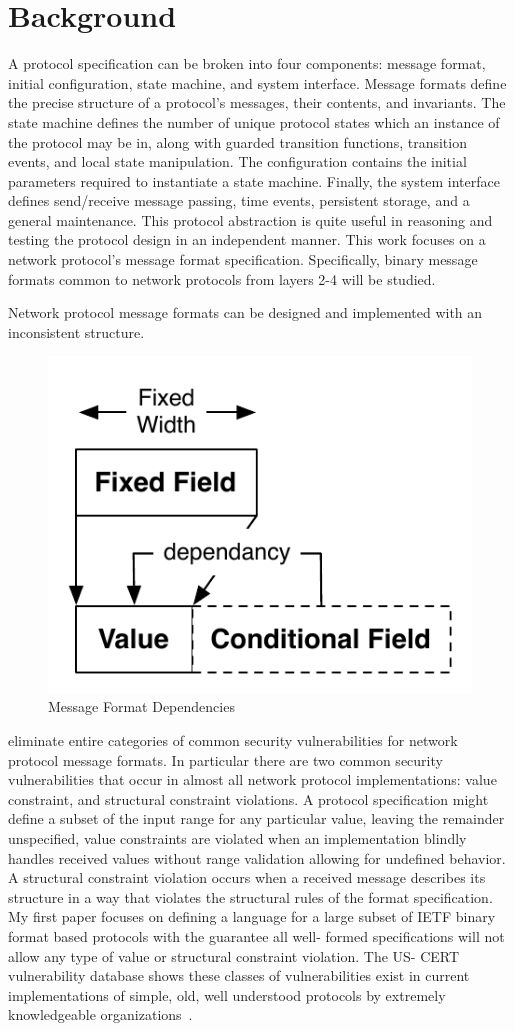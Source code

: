 \section{Background}
     
A protocol specification can be broken into four components: message format,
initial configuration, state machine, and system interface. Message formats
define the precise structure of a protocol's messages, their contents, and
invariants. The state machine defines the number of unique protocol states 
which an instance of the protocol may be in, along with guarded transition
functions, transition events, and local state manipulation. The configuration
contains the initial parameters required to instantiate a state machine.
Finally, the system interface defines send/receive message passing, time events,
persistent storage, and a general maintenance. This protocol abstraction is
quite useful in reasoning and testing the protocol design in an independent
manner. This work focuses on a network protocol's message format specification.
Specifically, binary message formats common to network protocols from layers 2-4
will be studied.

Network protocol message formats can be designed and implemented with an
inconsistent structure. 

\begin{figure}[h]
   \begin{center}
   \includegraphics[width=.40\textwidth]{figs/fig1.pdf}
   \caption{Message Format Dependencies}
   \label{figure:fig1}
   \end{center}
\end{figure}

eliminate entire categories of common security
vulnerabilities for network protocol message formats. In particular there are
two common security vulnerabilities that occur in almost all network protocol
implementations: value constraint, and structural constraint violations. A
protocol specification might define a subset of the input range for any
particular value, leaving the remainder unspecified, value constraints are
violated when an implementation blindly handles received values without range
validation allowing for undefined behavior. A structural constraint violation
occurs when a received message describes its structure in a way that violates
the structural rules of the format specification. My first paper focuses on
defining a language for a large subset of IETF binary format based protocols
with the guarantee all well- formed specifications will not allow any type of
value or structural constraint violation. The US- CERT vulnerability database
shows these classes of vulnerabilities exist in current implementations of
simple, old, well understood protocols by extremely knowledgeable organizations~\cite{us_cert}.

